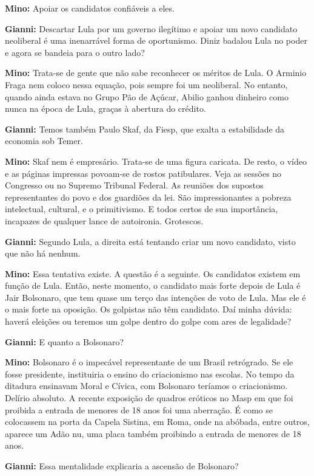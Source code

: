 \textbf{Mino:} Apoiar os candidatos confiáveis a eles.

\textbf{Gianni:} Descartar Lula por um governo ilegítimo e apoiar um
novo candidato neoliberal é uma inenarrável forma de oportunismo. Diniz
badalou Lula no poder e agora se bandeia para o outro lado?

\textbf{Mino:} Trata-se de gente que não sabe reconhecer os méritos de
Lula. O Arminio Fraga nem coloco nessa equação, pois sempre foi um
neoliberal. No entanto, quando ainda estava no Grupo Pão de Açúcar,
Abilio ganhou dinheiro como nunca na época de Lula, graças à abertura do
crédito.

\textbf{Gianni:} Temos também Paulo Skaf, da Fiesp, que exalta a
estabilidade da economia sob Temer.

\textbf{Mino:} Skaf nem é empresário. Trata-se de uma figura caricata.
De resto, o vídeo e as páginas impressas povoam-se de rostos
patibulares. Veja as sessões no Congresso ou no Supremo Tribunal
Federal. As reuniões dos supostos representantes do povo e dos guardiões
da lei. São impressionantes a pobreza intelectual, cultural, e o
primitivismo. E todos certos de sua importância, incapazes de qualquer
lance de autoironia. Grotescos.

\textbf{Gianni:} Segundo Lula, a direita está tentando criar um novo
candidato, visto que não há nenhum.

\textbf{Mino:} Essa tentativa existe. A questão é a seguinte. Os
candidatos existem em função de Lula. Então, neste momento, o candidato
mais forte depois de Lula é Jair Bolsonaro, que tem quase um terço das
intenções de voto de Lula. Mas ele é o mais forte na oposição. Os
golpistas não têm candidato. Daí minha dúvida: haverá eleições ou
teremos um golpe dentro do golpe com ares de legalidade?

\textbf{Gianni:} E quanto a Bolsonaro?

\textbf{Mino:} Bolsonaro é o impecável representante de um Brasil
retrógrado. Se ele fosse presidente, instituiria o ensino do
criacionismo nas escolas. No tempo da ditadura ensinavam Moral e Cívica,
com Bolsonaro teríamos o criacionismo. Delírio absoluto. A recente
exposição de quadros eróticos no Masp em que foi proibida a entrada de
menores de 18 anos foi uma aberração. É como se colocassem na porta da
Capela Sistina, em Roma, onde na abóbada, entre outros, aparece um Adão
nu, uma placa também proibindo a entrada de menores de 18 anos.

\textbf{Gianni:} Essa mentalidade explicaria a ascensão de Bolsonaro?

